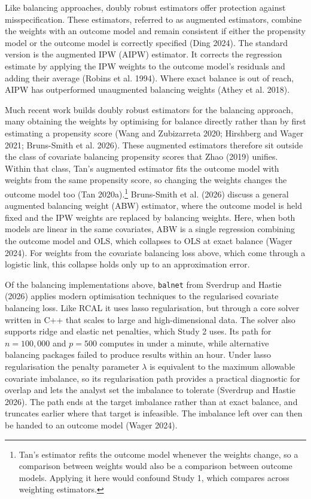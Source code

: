 \documentclass[
  12pt,
  a4paper,
]{article}
\begin{document}
Like balancing approaches, doubly robust estimators offer protection
against misspecification. These estimators, referred to as augmented
estimators, combine the weights with an outcome model and remain
consistent if either the propensity model or the outcome model is
correctly specified (Ding 2024). The standard version is the augmented
IPW (AIPW) estimator. It corrects the regression estimate by applying
the IPW weights to the outcome model's residuals and adding their
average (Robins et al. 1994). Where exact balance is out of reach, AIPW
has outperformed unaugmented balancing weights (Athey et al. 2018).

Much recent work builds doubly robust estimators for the balancing
approach, many obtaining the weights by optimising for balance directly
rather than by first estimating a propensity score (Wang and Zubizarreta
2020; Hirshberg and Wager 2021; Bruns-Smith et al. 2026). These
augmented estimators therefore sit outside the class of covariate
balancing propensity scores that Zhao (2019) unifies. Within that class,
Tan's augmented estimator fits the outcome model with weights from the
same propensity score, so changing the weights changes the outcome model
too (Tan 2020a).\footnote{Tan's estimator refits the outcome model
  whenever the weights change, so a comparison between weights would
  also be a comparison between outcome models. Applying it here would
  confound Study 1, which compares across weighting estimators.}
Bruns-Smith et al. (2026) discuss a general augmented balancing weight
(ABW) estimator, where the outcome model is held fixed and the IPW
weights are replaced by balancing weights. Here, when both models are
linear in the same covariates, ABW is a single regression combining the
outcome model and OLS, which collapses to OLS at exact balance (Wager
2024). For weights from the covariate balancing loss above, which come
through a logistic link, this collapse holds only up to an approximation
error.

Of the balancing implementations above, \texttt{balnet} from Sverdrup
and Hastie (2026) applies modern optimisation techniques to the
regularised covariate balancing loss. Like RCAL it uses lasso
regularisation, but through a core solver written in C++ that scales to
large and high-dimensional data. The solver also supports ridge and
elastic net penalties, which Study 2 uses. Its path for
\(n = 100{,}000\) and \(p = 500\) computes in under a minute, while
alternative balancing packages failed to produce results within an hour.
Under lasso regularisation the penalty parameter \(\lambda\) is
equivalent to the maximum allowable covariate imbalance, so its
regularisation path provides a practical diagnostic for overlap and lets
the analyst set the imbalance to tolerate (Sverdrup and Hastie 2026).
The path ends at the target imbalance rather than at exact balance, and
truncates earlier where that target is infeasible. The imbalance left
over can then be handed to an outcome model (Wager 2024).
\end{document}
